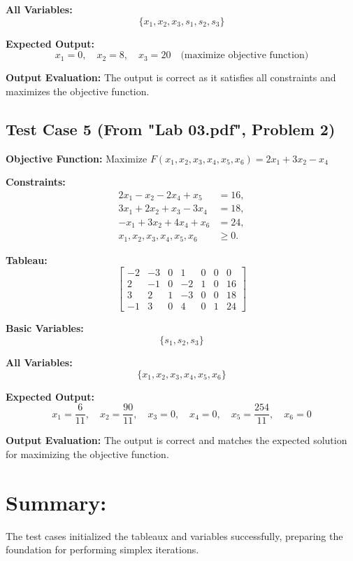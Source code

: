\documentclass{article}
\begin{document}
\textbf{All Variables:}
\[
\{ x_1, x_2, x_3, s_1, s_2, s_3 \}
\]

\textbf{Expected Output:}
\[
x_1 = 0, \quad x_2 = 8, \quad x_3 = 20 \quad \text{(maximize objective function)}
\]

\textbf{Output Evaluation:} The output is correct as it satisfies all constraints and maximizes the objective function.

\subsection*{Test Case 5 (From "Lab 03.pdf", Problem 2)}

\textbf{Objective Function:} Maximize \( F(x_1, x_2, x_3, x_4, x_5, x_6) = 2x_1 + 3x_2 - x_4 \)

\textbf{Constraints:}
\[
\begin{aligned}
2x_1 - x_2 - 2x_4 + x_5 &= 16, \\
3x_1 + 2x_2 + x_3 - 3x_4 &= 18, \\
-x_1 + 3x_2 + 4x_4 + x_6 &= 24, \\
x_1, x_2, x_3, x_4, x_5, x_6 &\geq 0.
\end{aligned}
\]

\textbf{Tableau:}
\[
\begin{bmatrix}
-2 & -3 & 0 & 1 & 0 & 0 & 0 \\
2 & -1 & 0 & -2 & 1 & 0 & 16 \\
3 & 2 & 1 & -3 & 0 & 0 & 18 \\
-1 & 3 & 0 & 4 & 0 & 1 & 24
\end{bmatrix}
\]

\textbf{Basic Variables:}
\[
\{ s_1, s_2, s_3 \}
\]

\textbf{All Variables:}
\[
\{ x_1, x_2, x_3, x_4, x_5, x_6 \}
\]

\textbf{Expected Output:}
\[
x_1 = \frac{6}{11}, \quad x_2 = \frac{90}{11}, \quad x_3 = 0, \quad x_4 = 0, \quad x_5 = \frac{254}{11}, \quad x_6 = 0
\]

\textbf{Output Evaluation:} The output is correct and matches the expected solution for maximizing the objective function.
\[
\]
\[
\]
\[
\]
\section*{Summary:}
The test cases initialized the tableaux and variables successfully, preparing the foundation for performing simplex iterations.
\end{document}

